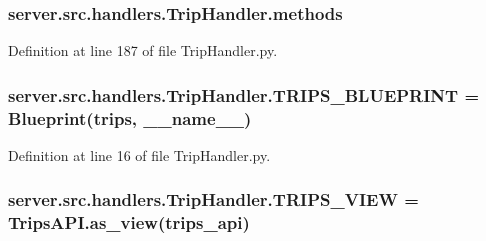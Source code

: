 \subsubsection[{\texorpdfstring{methods}{methods}}]{\setlength{\rightskip}{0pt plus 5cm}server.\+src.\+handlers.\+Trip\+Handler.\+methods}\hypertarget{namespaceserver_1_1src_1_1handlers_1_1_trip_handler_afc7d4f1f42d23429183324dde99b2179}{}\label{namespaceserver_1_1src_1_1handlers_1_1_trip_handler_afc7d4f1f42d23429183324dde99b2179}


Definition at line 187 of file Trip\+Handler.\+py.

\subsubsection[{\texorpdfstring{T\+R\+I\+P\+S\+\_\+\+B\+L\+U\+E\+P\+R\+I\+NT}{TRIPS_BLUEPRINT}}]{\setlength{\rightskip}{0pt plus 5cm}server.\+src.\+handlers.\+Trip\+Handler.\+T\+R\+I\+P\+S\+\_\+\+B\+L\+U\+E\+P\+R\+I\+NT = Blueprint(\textquotesingle{}trips\textquotesingle{}, \+\_\+\+\_\+name\+\_\+\+\_\+)}\hypertarget{namespaceserver_1_1src_1_1handlers_1_1_trip_handler_af379acb9ec70b55c14ca89c6d65564e6}{}\label{namespaceserver_1_1src_1_1handlers_1_1_trip_handler_af379acb9ec70b55c14ca89c6d65564e6}


Definition at line 16 of file Trip\+Handler.\+py.

\subsubsection[{\texorpdfstring{T\+R\+I\+P\+S\+\_\+\+V\+I\+EW}{TRIPS_VIEW}}]{\setlength{\rightskip}{0pt plus 5cm}server.\+src.\+handlers.\+Trip\+Handler.\+T\+R\+I\+P\+S\+\_\+\+V\+I\+EW = Trips\+A\+P\+I.\+as\+\_\+view(\textquotesingle{}trips\+\_\+api\textquotesingle{})}\hypertarget{namespaceserver_1_1src_1_1handlers_1_1_trip_handler_a94ec30c88e16689c6cbffd79da2afbd0}{}\label{namespaceserver_1_1src_1_1handlers_1_1_trip_handler_a94ec30c88e16689c6cbffd79da2afbd0}



